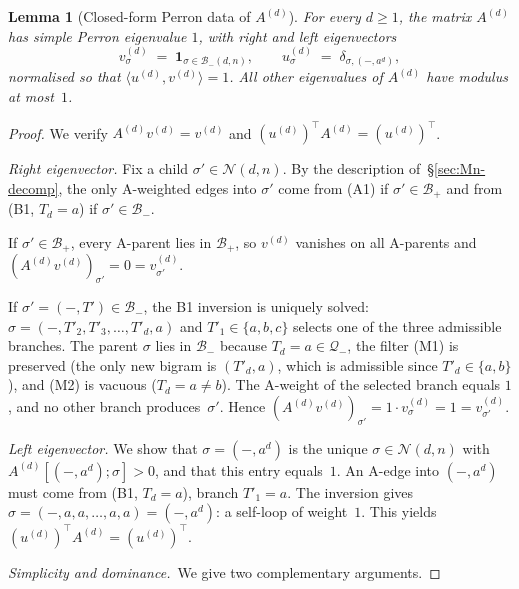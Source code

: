 \documentclass{amsart}
\newtheorem{lemma}[theorem]{Lemma}
\theoremstyle{definition}
\theoremstyle{remark}
\begin{document}
\begin{lemma}[Closed-form Perron data of $A^{(d)}$]
\label{lem:A-eigenvectors}
For every $d \ge 1$, the matrix $A^{(d)}$ has simple Perron
eigenvalue $1$, with right and left eigenvectors
\begin{equation}\label{eq:uv-closed}
  v^{(d)}_\sigma \;=\; \mathbf{1}_{\sigma \in \mathcal{B}_-(d, n)},
  \qquad
  u^{(d)}_\sigma \;=\; \delta_{\sigma, (-, a^d)},
\end{equation}
normalised so that $\langle u^{(d)}, v^{(d)}\rangle = 1$.  All
other eigenvalues of $A^{(d)}$ have modulus at most~$1$.
\end{lemma}

\begin{proof}
We verify $A^{(d)} v^{(d)} = v^{(d)}$ and
$(u^{(d)})^\top A^{(d)} = (u^{(d)})^\top$.

\emph{Right eigenvector.}  Fix a child $\sigma' \in \mathcal{N}(d, n)$.
By the description of~\S\ref{sec:Mn-decomp}, the only A-weighted
edges into $\sigma'$ come from (A1) if $\sigma' \in \mathcal{B}_+$
and from (B1, $T_d = a$) if $\sigma' \in \mathcal{B}_-$.

If $\sigma' \in \mathcal{B}_+$, every A-parent lies in
$\mathcal{B}_+$, so $v^{(d)}$ vanishes on all A-parents and
$(A^{(d)} v^{(d)})_{\sigma'} = 0 = v^{(d)}_{\sigma'}$.

If $\sigma' = (-, T') \in \mathcal{B}_-$, the B1 inversion is
uniquely solved: $\sigma = (-, T'_2, T'_3, \ldots, T'_d, a)$ and
$T'_1 \in \{a, b, c\}$ selects one of the three admissible
branches.  The parent $\sigma$ lies in $\mathcal{B}_-$ because
$T_d = a \in \mathcal{Q}_-$, the filter (M1) is preserved (the
only new bigram is $(T'_d, a)$, which is admissible since
$T'_d \in \{a, b\}$), and (M2) is vacuous ($T_d = a \neq b$).
The A-weight of the selected branch equals $1$, and no other
branch produces~$\sigma'$.  Hence
$(A^{(d)} v^{(d)})_{\sigma'} = 1 \cdot v^{(d)}_{\sigma}
  = 1 = v^{(d)}_{\sigma'}$.

\emph{Left eigenvector.}  We show that $\sigma = (-, a^d)$ is the
unique $\sigma \in \mathcal{N}(d, n)$ with
$A^{(d)}[(-, a^d); \sigma] > 0$, and that this entry equals~$1$.
An A-edge into $(-, a^d)$ must come from (B1, $T_d = a$), branch
$T'_1 = a$.  The inversion gives
$\sigma = (-, a, a, \ldots, a, a) = (-, a^d)$: a self-loop of
weight~$1$.  This yields $(u^{(d)})^\top A^{(d)} = (u^{(d)})^\top$.

\emph{Simplicity and dominance.}\ We give two complementary
arguments.


\end{proof}
\end{document}
